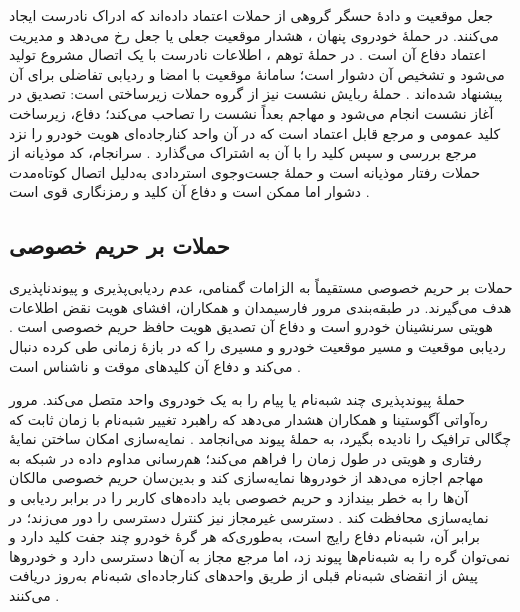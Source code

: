 \documentclass[12pt,a4paper]{article}
\begin{document}
جعل موقعیت و دادهٔ حسگر گروهی از حملات اعتماد داده‌اند که ادراک نادرست ایجاد می‌کنند. در حملهٔ خودروی پنهان ، هشدار موقعیت جعلی یا جعل  رخ می‌دهد و مدیریت اعتماد دفاع آن است \cite{farsimadanReviewSecurityChallenges2025}. در حملهٔ توهم ، اطلاعات نادرست با یک اتصال مشروع تولید می‌شود و تشخیص آن دشوار است؛ سامانهٔ موقعیت با امضا و ردیابی تفاضلی برای آن پیشنهاد شده‌اند \cite{farsimadanReviewSecurityChallenges2025}. حملهٔ ربایش نشست  نیز از گروه حملات زیرساختی است: تصدیق در آغاز نشست انجام می‌شود و مهاجم بعداً نشست را تصاحب می‌کند؛ دفاع، زیرساخت کلید عمومی و مرجع قابل اعتماد است که در آن واحد کنارجاده‌ای هویت خودرو را نزد مرجع بررسی و سپس کلید را با آن به اشتراک می‌گذارد \cite{farsimadanReviewSecurityChallenges2025}. سرانجام، کد موذیانه  از حملات رفتار موذیانه است \cite{farsimadanReviewSecurityChallenges2025} و حملهٔ جست‌وجوی استردادی  به‌دلیل اتصال کوتاه‌مدت دشوار اما ممکن است و دفاع آن کلید و رمزنگاری قوی است \cite{farsimadanReviewSecurityChallenges2025}.

\subsection{حملات بر حریم خصوصی}

حملات بر حریم خصوصی مستقیماً به الزامات گمنامی، عدم ردیابی‌پذیری و پیوندناپذیری هدف می‌گیرند. در طبقه‌بندی مرور فارسیمدان و همکاران، افشای هویت  نقض اطلاعات هویتی سرنشینان خودرو است و دفاع آن تصدیق هویت حافظ حریم خصوصی است \cite{farsimadanReviewSecurityChallenges2025}. ردیابی موقعیت و مسیر  موقعیت خودرو و مسیری را که در بازهٔ زمانی طی کرده دنبال می‌کند و دفاع آن کلید‌های موقت و ناشناس است \cite{farsimadanReviewSecurityChallenges2025}.

حملهٔ پیوندپذیری  چند شبه‌نام یا پیام را به یک خودروی واحد متصل می‌کند. مرور ره‌آواتی آگوستینا و همکاران هشدار می‌دهد که راهبرد تغییر شبه‌نام با زمان ثابت که چگالی ترافیک را نادیده بگیرد، به حملهٔ پیوند می‌انجامد \cite{rahmawatiagustinaSystematicLiteratureReview2025}. نمایه‌سازی  امکان ساختن نمایهٔ رفتاری و هویتی در طول زمان را فراهم می‌کند؛ هم‌رسانی مداوم داده در شبکه به مهاجم اجازه می‌دهد از خودرو‌ها نمایه‌سازی کند و بدین‌سان حریم خصوصی مالکان آن‌ها را به خطر بیندازد \cite{rahmawatiagustinaSystematicLiteratureReview2025} و حریم خصوصی باید داده‌های کاربر را در برابر ردیابی و نمایه‌سازی محافظت کند \cite{VanetSecurityPrivacy}. دسترسی غیرمجاز نیز کنترل دسترسی را دور می‌زند؛ در برابر آن، شبه‌نام دفاع رایج است، به‌طوری‌که هر گرهٔ خودرو چند جفت کلید دارد و نمی‌توان گره را به شبه‌نام‌ها پیوند زد، اما مرجع مجاز به آن‌ها دسترسی دارد و خودرو‌ها پیش از انقضای شبه‌نام قبلی از طریق واحد‌های کنارجاده‌ای شبه‌نام به‌روز دریافت می‌کنند \cite{farsimadanReviewSecurityChallenges2025}.
\end{document}
